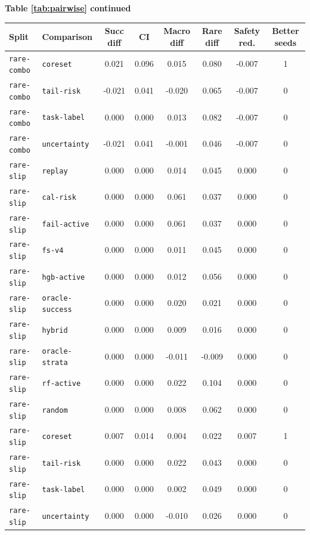 \documentclass{article}
\begin{document}
\begin{center}
\textbf{Table \ref{tab:pairwise} continued}\\[0.4ex]
\begin{tabular}{llcccccc}
\toprule
Split & Comparison & Succ diff & CI & Macro diff & Rare diff & Safety red. & Better seeds \\
\midrule
\texttt{rare-combo} & \texttt{coreset} & 0.021 & 0.096 & 0.015 & 0.080 & -0.007 & 1 \\
\texttt{rare-combo} & \texttt{tail-risk} & -0.021 & 0.041 & -0.020 & 0.065 & -0.007 & 0 \\
\texttt{rare-combo} & \texttt{task-label} & 0.000 & 0.000 & 0.013 & 0.082 & -0.007 & 0 \\
\texttt{rare-combo} & \texttt{uncertainty} & -0.021 & 0.041 & -0.001 & 0.046 & -0.007 & 0 \\
\texttt{rare-slip} & \texttt{replay} & 0.000 & 0.000 & 0.014 & 0.045 & 0.000 & 0 \\
\texttt{rare-slip} & \texttt{cal-risk} & 0.000 & 0.000 & 0.061 & 0.037 & 0.000 & 0 \\
\texttt{rare-slip} & \texttt{fail-active} & 0.000 & 0.000 & 0.061 & 0.037 & 0.000 & 0 \\
\texttt{rare-slip} & \texttt{fs-v4} & 0.000 & 0.000 & 0.011 & 0.045 & 0.000 & 0 \\
\texttt{rare-slip} & \texttt{hgb-active} & 0.000 & 0.000 & 0.012 & 0.056 & 0.000 & 0 \\
\texttt{rare-slip} & \texttt{oracle-success} & 0.000 & 0.000 & 0.020 & 0.021 & 0.000 & 0 \\
\texttt{rare-slip} & \texttt{hybrid} & 0.000 & 0.000 & 0.009 & 0.016 & 0.000 & 0 \\
\texttt{rare-slip} & \texttt{oracle-strata} & 0.000 & 0.000 & -0.011 & -0.009 & 0.000 & 0 \\
\texttt{rare-slip} & \texttt{rf-active} & 0.000 & 0.000 & 0.022 & 0.104 & 0.000 & 0 \\
\texttt{rare-slip} & \texttt{random} & 0.000 & 0.000 & 0.008 & 0.062 & 0.000 & 0 \\
\texttt{rare-slip} & \texttt{coreset} & 0.007 & 0.014 & 0.004 & 0.022 & 0.007 & 1 \\
\texttt{rare-slip} & \texttt{tail-risk} & 0.000 & 0.000 & 0.022 & 0.043 & 0.000 & 0 \\
\texttt{rare-slip} & \texttt{task-label} & 0.000 & 0.000 & 0.002 & 0.049 & 0.000 & 0 \\
\texttt{rare-slip} & \texttt{uncertainty} & 0.000 & 0.000 & -0.010 & 0.026 & 0.000 & 0 \\
\bottomrule
\end{tabular}
\end{center}
\normalsize
\end{document}
